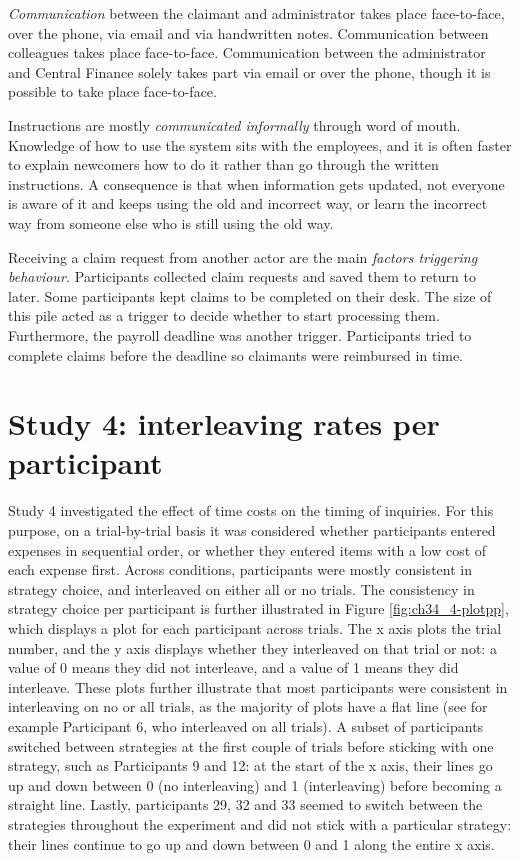 \textit{Communication} between the claimant and administrator takes place face-to-face, over the phone, via email and via handwritten notes. Communication between colleagues takes place face-to-face. Communication between the administrator and Central Finance solely takes part via email or over the phone, though it is possible to take place face-to-face.

Instructions are mostly \textit{communicated informally} through word of mouth. Knowledge of how to use the system sits with the employees, and it is often faster to explain newcomers how to do it rather than go through the written instructions. A consequence is that when information gets updated, not everyone is aware of it and keeps using the old and incorrect way, or learn the incorrect way from someone else who is still using the old way. 

Receiving a claim request from another actor are the main \textit{factors triggering behaviour.} Participants collected claim requests and saved them to return to later. Some participants kept claims to be completed on their desk. The size of this pile acted as a trigger to decide whether to start processing them. Furthermore, the payroll deadline was another trigger. Participants tried to complete claims before the deadline so claimants were reimbursed in time.

\chapter{Study 4: interleaving rates per participant}\label{ch:S4_PartPlots}
Study 4 investigated the effect of time costs on the timing of inquiries. For this purpose, on a trial-by-trial basis it was considered whether participants entered expenses in sequential order, or whether they entered items with a low cost of each expense first. Across conditions, participants were mostly consistent in strategy choice, and interleaved on either all or no trials. The consistency in strategy choice per participant is further illustrated in Figure \ref{fig:ch34_4-plotpp}, which displays a plot for each participant across trials. The x axis plots the trial number, and the y axis displays whether they interleaved on that trial or not: a value of 0 means they did not interleave, and a value of 1 means they did interleave. These plots further illustrate that most participants were consistent in interleaving on no or all trials, as the majority of plots have a flat line (see for example Participant 6, who interleaved on all trials). A subset of participants switched between strategies at the first couple of trials before sticking with one strategy, such as Participants 9 and 12: at the start of the x axis, their lines go up and down between 0 (no interleaving) and 1 (interleaving) before becoming a straight line. Lastly, participants 29, 32 and 33 seemed to switch between the strategies throughout the experiment and did not stick with a particular strategy: their lines continue to go up and down between 0 and 1 along the entire x axis. 


